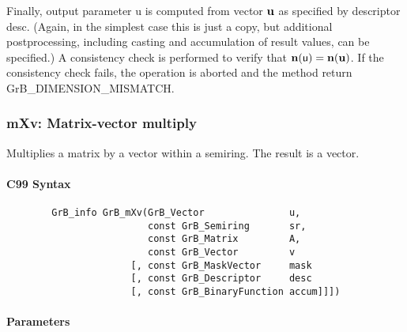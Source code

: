 Finally, output parameter {\sf u} is computed from vector ${\bf u}$
as specified by descriptor {\sf desc}. (Again, in the simplest case this
is just a copy, but additional postprocessing, including casting and
accumulation of result values, can be specified.)  A consistency check is
performed to verify that $\bold{n}({\sf u}) = \bold{n}({\bf u})$. If
the consistency check fails, the operation is aborted and the method
return {\sf GrB\_DIMENSION\_MISMATCH}.

 


\subsubsection{{\sf mXv}: Matrix-vector multiply}

Multiplies a matrix by a vector within a semiring. The result is a vector.

\paragraph{C99 Syntax}

\begin{verbatim}
        GrB_info GrB_mXv(GrB_Vector               u,
                         const GrB_Semiring       sr, 
                         const GrB_Matrix         A,
                         const GrB_Vector         v
                      [, const GrB_MaskVector     mask
                      [, const GrB_Descriptor     desc
                      [, const GrB_BinaryFunction accum]]])
\end{verbatim}

\paragraph{Parameters}

